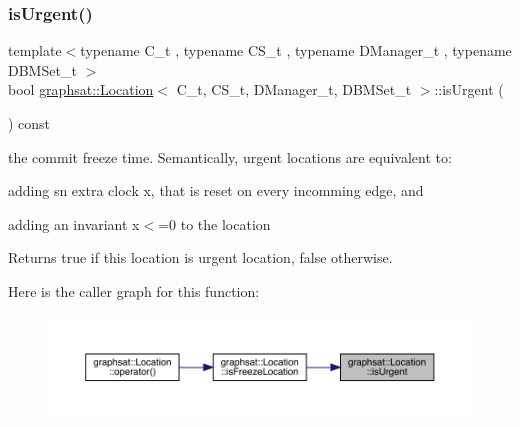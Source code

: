 \subsubsection{\texorpdfstring{isUrgent()}{isUrgent()}}
{\footnotesize\ttfamily template$<$typename C\+\_\+t , typename C\+S\+\_\+t , typename D\+Manager\+\_\+t , typename D\+B\+M\+Set\+\_\+t $>$ \\
bool \mbox{\hyperlink{classgraphsat_1_1_location}{graphsat\+::\+Location}}$<$ C\+\_\+t, C\+S\+\_\+t, D\+Manager\+\_\+t, D\+B\+M\+Set\+\_\+t $>$\+::is\+Urgent (\begin{DoxyParamCaption}{ }\end{DoxyParamCaption}) const\hspace{0.3cm}{\ttfamily [inline]}}



the commit freeze time. Semantically, urgent locations are equivalent to\+: 


\begin{DoxyEnumerate}
\item adding sn extra clock x, that is reset on every incomming edge, and
\item adding an invariant x$<$=0 to the location
\end{DoxyEnumerate}

\begin{DoxyReturn}{Returns}
true if this location is urgent location, false otherwise. 
\end{DoxyReturn}
Here is the caller graph for this function\+:
\nopagebreak
\begin{figure}[H]
\begin{center}
\leavevmode
\includegraphics[width=350pt]{classgraphsat_1_1_location_a446eebc27230db6d46e952d912d8a9c1_icgraph}
\end{center}
\end{figure}
\mbox{\label{classgraphsat_1_1_location_acff10a7428288b8377a65c3377949160}} 
